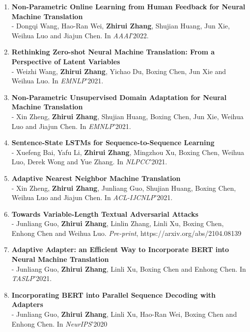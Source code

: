 \documentclass{resume}
\begin{document}
\begin{enumerate}
\item \normalsize \textbf{Non-Parametric Online Learning from Human Feedback for Neural Machine Translation}\\
\small - Dongqi Wang, Hao-Ran Wei, \textbf{Zhirui Zhang}, Shujian Huang, Jun Xie, Weihua Luo and Jiajun Chen. In \textit{AAAI}'2022.

\item \normalsize \textbf{Rethinking Zero-shot Neural Machine Translation: From a Perspective of Latent Variables}\\
\small - Weizhi Wang, \textbf{Zhirui Zhang}, Yichao Du, Boxing Chen, Jun Xie and Weihua Luo. In \textit{EMNLP}'2021.

\item \normalsize \textbf{Non-Parametric Unsupervised Domain Adaptation for Neural Machine Translation}\\
\small - Xin Zheng, \textbf{Zhirui Zhang}, Shujian Huang, Boxing Chen, Jun Xie, Weihua Luo and Jiajun Chen. In \textit{EMNLP}'2021.

\item \normalsize \textbf{Sentence-State LSTMs for Sequence-to-Sequence Learning}\\
\small - Xuefeng Bai, Yafu Li, \textbf{Zhirui Zhang}, Mingzhou Xu, Boxing Chen, Weihua Luo, Derek Wong and Yue Zhang. In \textit{NLPCC}'2021.

\item \normalsize \textbf{Adaptive Nearest Neighbor Machine Translation}\\
\small - Xin Zheng, \textbf{Zhirui Zhang}, Junliang Guo, Shujian Huang, Boxing Chen, Weihua Luo and Jiajun Chen. In \textit{ACL-IJCNLP}'2021.

\item \normalsize \textbf{Towards Variable-Length Textual Adversarial Attacks}\\
\small - Junliang Guo, \textbf{Zhirui Zhang}, Linlin Zhang, Linli Xu, Boxing Chen, Enhong Chen and Weihua Luo. \textit{Pre-print}, https://arxiv.org/abs/2104.08139 

\item \normalsize \textbf{Adaptive Adapter: an Efficient
Way to Incorporate BERT into Neural Machine Translation}\\
\small - Junliang Guo, \textbf{Zhirui Zhang}, Linli Xu, Boxing Chen and Enhong Chen. In \textit{TASLP}'2021.

\item \normalsize \textbf{Incorporating BERT into Parallel Sequence Decoding with Adapters}\\
\small - Junliang Guo, \textbf{Zhirui Zhang}, Linli Xu, Hao-Ran Wei, Boxing Chen and Enhong Chen. In \textit{NeurIPS}'2020


\end{enumerate}
\end{document}
